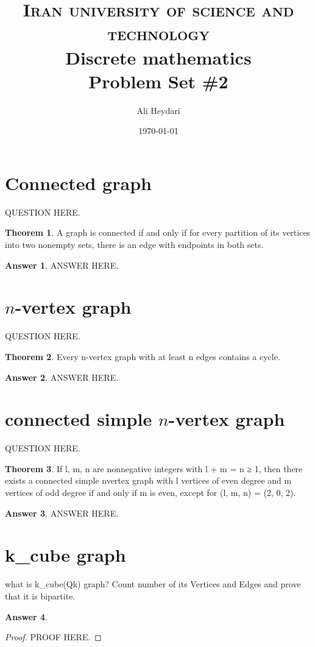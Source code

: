 \documentclass[a4paper]{article}
\title{
\textsc{Iran university of science and technology} \\ [25pt] %
Discrete mathematics\\Problem Set \#2 \\
}
\author{Ali Heydari}
\date{\today}
\renewcommand{\(}{\left(}
\renewcommand{\)}{\right)}
\theoremstyle{plain}
\theoremstyle{plain}
\theoremstyle{definition}
\newtheorem*{answer}{Answer}
\newtheorem{theorem}{Theorem}[section]
\begin{document}
\maketitle

\section{Connected graph}
QUESTION HERE.
\begin{theorem}
A graph is connected if and only if for every partition of its vertices into two nonempty sets, there
is an edge with endpoints in both sets.
\end{theorem}
\begin{shaded}
\begin{answer}
ANSWER HERE.
\end{answer}
\end{shaded}

\section{$n$-vertex graph}
QUESTION HERE.
\begin{theorem}
Every n-vertex graph with at least n edges contains a cycle.
\end{theorem}
\begin{shaded}
\begin{answer}
ANSWER HERE.
\end{answer}
\end{shaded}
\section{connected simple $n$-vertex graph}
QUESTION HERE.
\begin{theorem}
If l, m, n are nonnegative integers with l + m = n ≥ 1, then there exists a connected simple nvertex
graph with l vertices of even degree and m vertices of odd degree if and only if m is even,
except for (l, m, n) = (2, 0, 2).
\end{theorem}
\begin{shaded}
\begin{answer}
ANSWER HERE.
\end{answer}
\end{shaded}



\section{k\_cube graph}
what is k\_cube(Qk) graph?
Count number of its Vertices and Edges and prove that it is bipartite.
\begin{shaded}
\begin{answer}
\begin{proof}
PROOF HERE.
\end{proof}
\end{answer}
\end{shaded}
\end{document}

